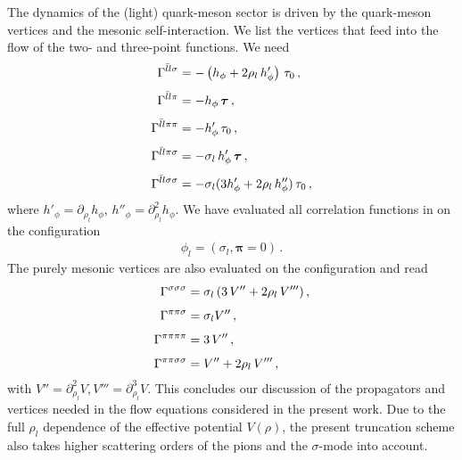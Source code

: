 \documentclass[aps,twocolumn,prd,superscriptaddress]{revtex4-2}
\begin{document}
The dynamics of the (light) quark-meson sector is driven by the quark-meson vertices and the mesonic self-interaction. We list the vertices that feed into the flow of the two- and three-point functions. We need 
%
\begin{align}
	\Gamma^{\bar ll\sigma}       & = - \left( h_\phi + 2 \rho_l\,  h'_\phi\right)\, \tau_0\,,
	\notag                                                                                                                                   \\[1ex]
	\Gamma^{\bar ll\pi}          & = - h_\phi\,\boldsymbol{\tau}\,,
	\notag                                                                                                                                   \\[1ex]
	\Gamma^{\bar ll\pi\pi}       & = - h'_\phi\,\tau_0\,,
	\notag                                                                                                                                   \\[1ex]
	\Gamma^{\bar ll\pi\sigma}    & = - \sigma_l\, h'_\phi\,\boldsymbol{\tau}\,,
	\notag                                                                                                                                   \\[1ex]
	\Gamma^{\bar{l}l\sigma\sigma} & = - \sigma_l (3 h'_\phi + 2 \rho_l\, h''_\phi)\,\tau_0\,,
	\label{eq:qphin}
\end{align}
%
where $h'_\phi = \partial_{\rho_l} h_\phi$, $h''_\phi =\partial^2_{\rho_l} h_\phi$. We have evaluated all correlation functions in  on the configuration 
%
\begin{align}
	\phi_l= \left(\sigma_l, \boldsymbol{\pi}=0 \right)\,.
\label{eq:phiExpand}
\end{align}
%
The purely mesonic vertices are also evaluated on the configuration  and read 
%
\begin{align}
	\Gamma^{\sigma\sigma\sigma} & =\sigma_l\, ( 3 \, V'' + 2 \rho_l \, V''')  \,,
	\notag                                                                                                              \\[1ex]
	\Gamma^{\pi\pi\sigma}       & = \sigma_l V''\,,
	\notag                                                                                                              \\[1ex]
	\Gamma^{\pi\pi\pi\pi}       & = 3\,V''\,,
	\notag                                                                                                              \\[1ex]
	\Gamma^{\pi\pi\sigma\sigma} & = V'' + 2 \rho_l\,  V'''\,, 
	\label{eq:phin}
\end{align}
%
with $V''=\partial_{\rho_l}^2 V, V'''=\partial_{\rho_l}^3 V$. This concludes our discussion of the propagators and vertices needed in the flow equations considered in the present work. Due to the full $\rho_l$ dependence of the effective potential $V(\rho)$, the present truncation scheme also takes higher scattering orders of the pions and the $\sigma$-mode into account.
\end{document}
